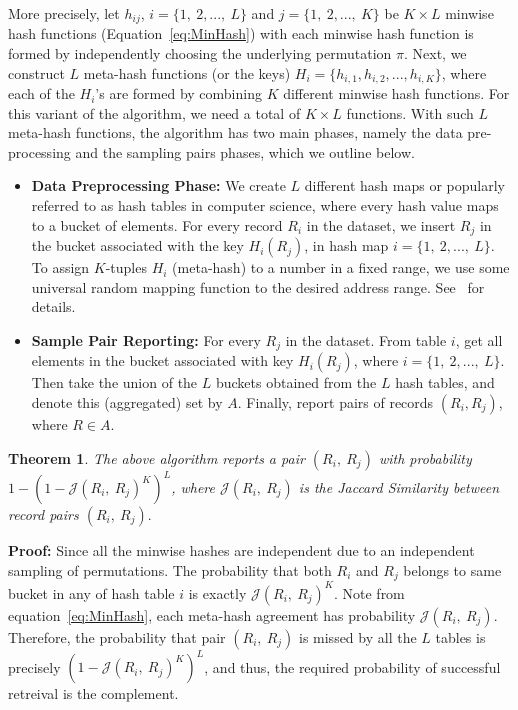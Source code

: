 \documentclass[aoas]{imsart}
\newtheorem{theorem}{Theorem}
\begin{document}
More precisely, let $h_{ij}$, $i = \{1, \ 2,...,\ L\}$ and $j = \{1, \ 2,...,\ K\}$ be $K \times L$ minwise hash functions (Equation~\ref{eq:MinHash}) with each minwise hash function is formed by independently choosing the underlying permutation $\pi$. Next, we construct $L$ meta-hash functions (or the keys) $H_i = \{h_{i,1}, h_{i,2},...,h_{i,K}\}$, where each of the $H_i$'s are formed by combining $K$ different minwise hash functions. For this variant of the algorithm, we need a total of $K \times L$ functions. With such $L$ meta-hash functions, the algorithm has two main phases, namely the data pre-processing and the sampling pairs phases, which we outline below.

\begin{itemize}
  \item {\bf Data Preprocessing Phase:} We create $L$ different hash maps or popularly referred to as hash tables in computer science, where every hash value maps to a bucket of elements.   For every record $R_i$ in the dataset, we insert $R_j$ in the bucket associated  with the key $H_i(R_j)$, in hash map $i = \{1, \ 2, ..., \ L\}$. To assign $K$-tuples $H_i$ (meta-hash) to a number in a fixed range, we use some universal random mapping function to the desired address range. See~\cite{andoni20052} for details.
  \item {\bf Sample Pair Reporting:} For every $R_j$ in the dataset. From table $i$, get all elements in the bucket associated with key $H_i(R_j)$, where $i = \{1,\ 2,...,\ L\}$. Then take the union of the $L$ buckets obtained from the $L$ hash tables, and denote this (aggregated) set by $A.$ Finally, report pairs of records $(R_i, R_j)$, where $R \in A$.
\end{itemize}

\begin{theorem}
The above algorithm reports a pair $(R_i,\ R_j)$ with probability $1 - (1-\mathcal{J}(R_i,\ R_j)^K)^L$, where $\mathcal{J}(R_i,\ R_j)$ is the Jaccard Similarity between record pairs $(R_i,\ R_j).$
\end{theorem}
{\bf Proof:} Since all the minwise hashes are independent due to an independent sampling of permutations. The probability that both $R_i$ and $R_j$ belongs to same bucket in any of hash table $i$ is exactly $\mathcal{J}(R_i,\ R_j)^K$. Note from equation~\ref{eq:MinHash}, each meta-hash agreement has probability $\mathcal{J}(R_i,\ R_j)$. Therefore, the probability that pair $(R_i, \ R_j)$ is missed by all the $L$ tables is precisely $(1-\mathcal{J}(R_i,\ R_j)^K)^L$, and thus, the required probability of successful retreival is the complement.
\end{document}
